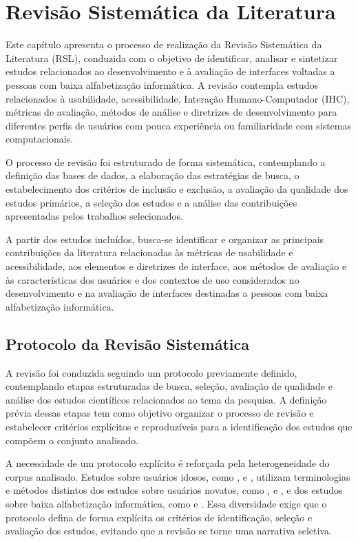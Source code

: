\chapter{Revisão Sistemática da Literatura}

\label{sec:revisao}

Este capítulo apresenta o processo de realização da Revisão Sistemática da Literatura (RSL), conduzida com o objetivo de identificar, analisar e sintetizar estudos relacionados ao desenvolvimento e à avaliação de interfaces voltadas a pessoas com baixa alfabetização informática. A revisão contempla estudos relacionados à usabilidade, acessibilidade, Interação Humano-Computador (IHC), métricas de avaliação, métodos de análise e diretrizes de desenvolvimento para diferentes perfis de usuários com pouca experiência ou familiaridade com sistemas computacionais.

O processo de revisão foi estruturado de forma sistemática, contemplando a definição das bases de dados, a elaboração das estratégias de busca, o estabelecimento dos critérios de inclusão e exclusão, a avaliação da qualidade dos estudos primários, a seleção dos estudos e a análise das contribuições apresentadas pelos trabalhos selecionados.

A partir dos estudos incluídos, busca-se identificar e organizar as principais contribuições da literatura relacionadas às métricas de usabilidade e acessibilidade, aos elementos e diretrizes de interface, aos métodos de avaliação e às características dos usuários e dos contextos de uso considerados no desenvolvimento e na avaliação de interfaces destinadas a pessoas com baixa alfabetização informática.


\section{Protocolo da Revisão Sistemática}

A revisão foi conduzida seguindo um protocolo previamente definido, contemplando etapas estruturadas de busca, seleção, avaliação de qualidade e análise dos estudos científicos relacionados ao tema da pesquisa. A definição prévia dessas etapas tem como objetivo organizar o processo de revisão e estabelecer critérios explícitos e reproduzíveis para a identificação dos estudos que compõem o conjunto analisado.

A necessidade de um protocolo explícito é reforçada pela heterogeneidade do corpus analisado. Estudos sobre usuários idosos, como \cite{sharit2008information}, \cite{gatsou2017seniors} e \cite{xie2010usability}, utilizam terminologias e métodos distintos dos estudos sobre usuários novatos, como \cite{nosseir2011novice}, \cite{cowan2011exploring} e \cite{kabassi2004personalised}, e dos estudos sobre baixa alfabetização informática, como \cite{filgueiras2009recoverability} e \cite{barron2013feasibility}. Essa diversidade exige que o protocolo defina de forma explícita os critérios de identificação, seleção e avaliação dos estudos, evitando que a revisão se torne uma narrativa seletiva.

